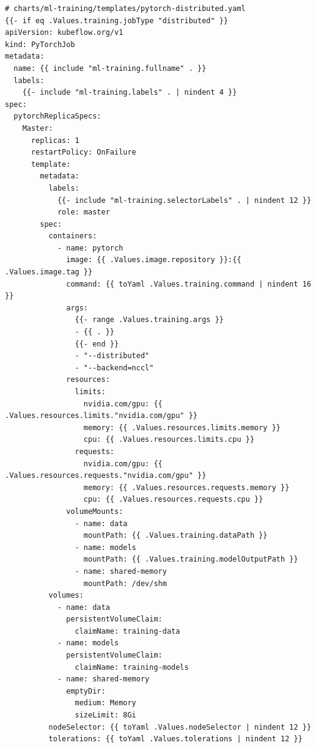 \begin{lstlisting}[style=yaml, caption=PyTorch Distributed Training Job]
# charts/ml-training/templates/pytorch-distributed.yaml
{{- if eq .Values.training.jobType "distributed" }}
apiVersion: kubeflow.org/v1
kind: PyTorchJob
metadata:
  name: {{ include "ml-training.fullname" . }}
  labels:
    {{- include "ml-training.labels" . | nindent 4 }}
spec:
  pytorchReplicaSpecs:
    Master:
      replicas: 1
      restartPolicy: OnFailure
      template:
        metadata:
          labels:
            {{- include "ml-training.selectorLabels" . | nindent 12 }}
            role: master
        spec:
          containers:
            - name: pytorch
              image: {{ .Values.image.repository }}:{{ .Values.image.tag }}
              command: {{ toYaml .Values.training.command | nindent 16 }}
              args:
                {{- range .Values.training.args }}
                - {{ . }}
                {{- end }}
                - "--distributed"
                - "--backend=nccl"
              resources:
                limits:
                  nvidia.com/gpu: {{ .Values.resources.limits."nvidia.com/gpu" }}
                  memory: {{ .Values.resources.limits.memory }}
                  cpu: {{ .Values.resources.limits.cpu }}
                requests:
                  nvidia.com/gpu: {{ .Values.resources.requests."nvidia.com/gpu" }}
                  memory: {{ .Values.resources.requests.memory }}
                  cpu: {{ .Values.resources.requests.cpu }}
              volumeMounts:
                - name: data
                  mountPath: {{ .Values.training.dataPath }}
                - name: models
                  mountPath: {{ .Values.training.modelOutputPath }}
                - name: shared-memory
                  mountPath: /dev/shm
          volumes:
            - name: data
              persistentVolumeClaim:
                claimName: training-data
            - name: models
              persistentVolumeClaim:
                claimName: training-models
            - name: shared-memory
              emptyDir:
                medium: Memory
                sizeLimit: 8Gi
          nodeSelector: {{ toYaml .Values.nodeSelector | nindent 12 }}
          tolerations: {{ toYaml .Values.tolerations | nindent 12 }}


\end{lstlisting}
